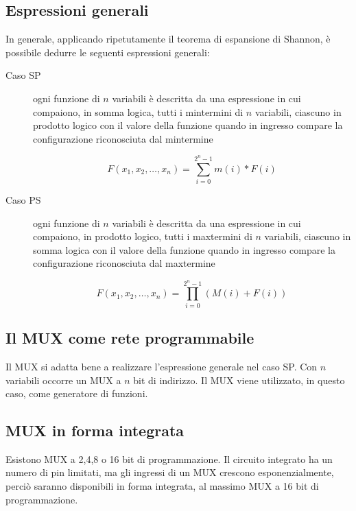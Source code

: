 \documentclass{article}
\begin{document}
\subsection{Espressioni generali}

In generale, applicando ripetutamente il teorema di espansione di Shannon, è possibile dedurre le seguenti espressioni generali:

\begin{description}
	\item[Caso SP] ogni funzione di $n$ variabili è descritta da una espressione in cui compaiono, in somma logica, tutti i mintermini di $n$ variabili, ciascuno in prodotto logico con il valore della funzione quando in ingresso compare la configurazione riconosciuta dal mintermine

	$$
    F(x_1, x_2, \dots, x_n) = \sum_{i=0}^{2^n-1} m(i) * F(i)
    $$

	\item[Caso PS] ogni funzione di $n$ variabili è descritta da una espressione in cui compaiono, in prodotto logico, tutti i maxtermini di $n$ variabili, ciascuno in somma logica con il valore della funzione quando in ingresso compare la configurazione riconosciuta dal maxtermine

	$$
    F(x_1, x_2, \dots, x_n) = \prod_{i=0}^{2^n-1} (M(i) + F(i))
    $$
\end{description}

\subsection{Il MUX come rete programmabile}

Il MUX si adatta bene a realizzare l'espressione generale nel caso SP.
Con $n$ variabili occorre un MUX a $n$ bit di indirizzo.
Il MUX viene utilizzato, in questo caso, come generatore di funzioni.

\subsection{MUX in forma integrata}

Esistono MUX a 2,4,8 o 16 bit di programmazione.
Il circuito integrato ha un numero di pin limitati, ma gli ingressi di un MUX crescono esponenzialmente, perciò saranno disponibili in forma integrata, al massimo MUX a 16 bit di programmazione.
\end{document}
